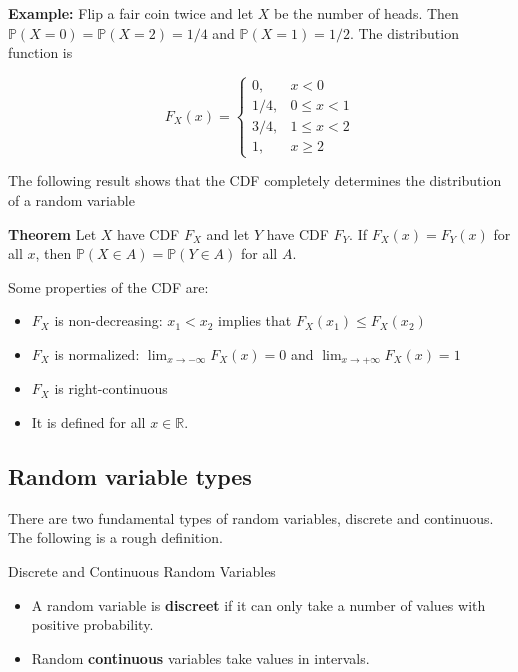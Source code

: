 \documentclass[
]{book}
\providecommand{\tightlist}{%
  \setlength{\itemsep}{0pt}\setlength{\parskip}{0pt}}
\theoremstyle{definition}
\theoremstyle{definition}
\theoremstyle{definition}
\theoremstyle{definition}
\theoremstyle{remark}
\begin{document}
\textbf{Example:} Flip a fair coin twice and let \(X\) be the number of heads. Then \(\mathbb{P}(X=0)=\mathbb{P}(X=2)=1/4\) and \(\mathbb{P}(X=1)=1/2\). The distribution function is

\[
F_X(x)=\left\{
\begin{array}{ll}
0, & x<0\\
1/4, & 0\leq x <1\\
3/4, & 1\leq x <2 \\
1, & x\geq 2
\end{array}
\right.
\]

The following result shows that the CDF completely determines the distribution of a random variable

\textbf{Theorem} Let \(X\) have CDF \(F_X\) and let \(Y\) have CDF \(F_Y\). If \(F_X(x)=F_Y(x)\) for all \(x\), then \(\mathbb{P}(X\in A)=\mathbb{P}(Y\in A)\) for all \(A\).

Some properties of the CDF are:

\begin{itemize}
\tightlist
\item
  \(F_X\) is non-decreasing: \(x_1<x_2\) implies that \(F_X(x_1)\leq F_X(x_2)\)
\item
  \(F_X\) is normalized: \(\lim_{x\rightarrow -\infty}F_X(x)=0\) and \(\lim_{x\rightarrow +\infty}F_X(x)=1\)
\item
  \(F_X\) is right-continuous
\item
  It is defined for all \(x\in\mathbb{R}\).
\end{itemize}

\hypertarget{random-variable-types}{%
\subsection{Random variable types}\label{random-variable-types}}

There are two fundamental types of random variables, discrete and continuous. The following is a rough definition.

Discrete and Continuous Random Variables

\begin{itemize}
\tightlist
\item
  A random variable is \textbf{discreet} if it can only take a number of values with positive probability.
\item
  Random \textbf{continuous} variables take values in intervals.
\end{itemize}
\end{document}
